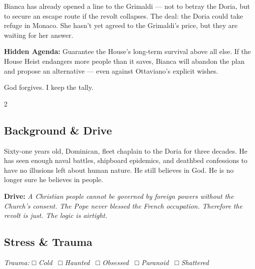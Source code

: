 \begin{secretbox}
Bianca has already opened a line to the Grimaldi --- not to betray the
Doria, but to secure an escape route if the revolt collapses. The deal:
the Doria could take refuge in Monaco. She hasn't yet agreed to the Grimaldi's
price, but they are waiting for her answer.

\medskip
\textbf{\textcolor{SecretRed}{Hidden Agenda:}} Guarantee the House's long-term survival above
all else. If the House Heist endangers more people than it saves,
Bianca will abandon the plan and propose an alternative --- even against
Ottaviano's explicit wishes.
\end{secretbox}

\newpage


%
  {God forgives. I keep the tally.}

\begin{multicols}{2}
\subsection*{Background \& Drive}
Sixty-one years old, Dominican, fleet chaplain to the Doria for three
decades. He has seen enough naval battles, shipboard epidemics, and
deathbed confessions to have no illusions left about human nature.
He still believes in God. He is no longer sure he believes in people.

\textbf{\textcolor{DoriaBlue}{Drive:}} \textit{A Christian people
cannot be governed by foreign powers without the Church's consent.
The Pope never blessed the French occupation. Therefore the revolt is
just. The logic is airtight.}
\columnbreak
\subsection*{Stress \& Trauma}
\textit{\small Trauma: □ Cold \ □ Haunted \ □ Obsessed \ □ Paranoid \ □ Shattered}
\end{multicols}

